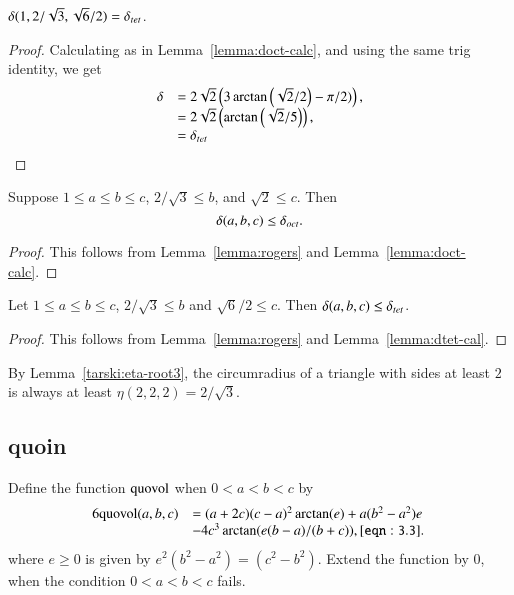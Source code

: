 \begin{lemma}
  $\delta(1,2/\sqrt3,\sqrt6/2)=\delta_{tet}$.
\end{lemma}

\begin{proof} Calculating as in Lemma~\ref{lemma:doct-calc}, and using
the same trig identity, we get
$$\begin{array}{lll}
  \delta &=
2\sqrt{2} \left(3\arctan\left(\sqrt2/2\right) - \pi/2)\right),\\
  &=2\sqrt{2}\left(\arctan\left(\sqrt2/5\right)\right),\\
  &=\delta_{tet}
\end{array}
$$
\end{proof}

\begin{lemma}
Suppose $1\le a\le  b\le c$,  $2/\sqrt{3}\le b$, and $\sqrt2\le c$.  Then
$$
\delta(a,b,c) \le \delta_{oct}.
$$
\end{lemma}

\begin{proof} This follows from Lemma~\ref{lemma:rogers} and
Lemma~\ref{lemma:doct-calc}.
\end{proof}

\begin{lemma}
Let $1\le a \le b \le c$, $2/\sqrt{3}\le b$ and $\sqrt6/2\le c$.
Then $\delta(a,b,c) \le  \delta_{tet}$.
\end{lemma}

\begin{proof}  This follows from Lemma~\ref{lemma:rogers} and
Lemma~\ref{lemma:dtet-cal}.
\end{proof}

By Lemma~\ref{tarski:eta-root3}, the circumradius of a triangle
with sides at least $2$ is always at least $\eta(2,2,2)=2/\sqrt3$.



\subsection{quoin}

Define the function ${\operatorname{quovol}}$ when $0<a<b<c$ by
    \begin{equation}
    \begin{array}{lll}
    6\op{quovol}(a,b,c) &= (a+2c)  %
    (c-a)^2\arctan(e)
        +a(b^2-a^2)e\\&-4c^3\arctan(e(b-a)/(b+c)),
    \tlabel{eqn:3.3}
    \end{array}
    \end{equation}
where $e\ge0$ is given by $e^2(b^2-a^2)=(c^2-b^2)$.
Extend the function by $0$, when the condition $0<a<b<c$ fails.


